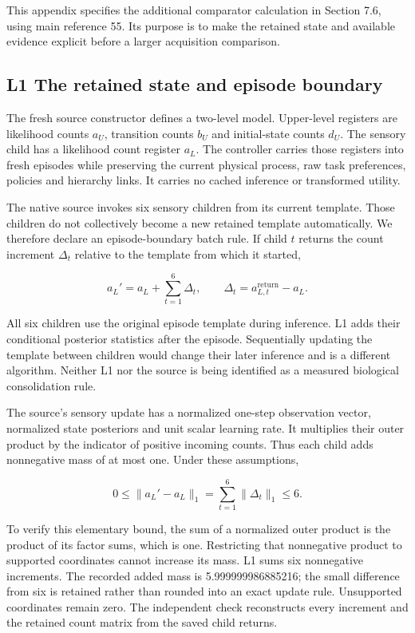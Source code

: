\documentclass[
  american,
  11pt,
  letterpaper,
]{article}
\begin{document}
This appendix specifies the additional comparator calculation in Section 7.6, using main reference 55. Its purpose is to make the retained state and available evidence explicit before a larger acquisition comparison.

\subsection{L1 The retained state and episode boundary}\label{l1-the-retained-state-and-episode-boundary}

The fresh source constructor defines a two-level model. Upper-level registers are likelihood counts \(a_U\), transition counts \(b_U\) and initial-state counts \(d_U\). The sensory child has a likelihood count register \(a_L\). The controller carries those registers into fresh episodes while preserving the current physical process, raw task preferences, policies and hierarchy links. It carries no cached inference or transformed utility.

The native source invokes six sensory children from its current template. Those children do not collectively become a new retained template automatically. We therefore declare an episode-boundary batch rule. If child \(t\) returns the count increment \(\Delta_t\) relative to the template from which it started,

\begin{equation}
a_L'=a_L+\sum_{t=1}^{6}\Delta_t,
\qquad \Delta_t=a_{L,t}^{\mathrm{return}}-a_L.
\tag{L1}
\end{equation}

All six children use the original episode template during inference. L1 adds their conditional posterior statistics after the episode. Sequentially updating the template between children would change their later inference and is a different algorithm. Neither L1 nor the source is being identified as a measured biological consolidation rule.

The source's sensory update has a normalized one-step observation vector, normalized state posteriors and unit scalar learning rate. It multiplies their outer product by the indicator of positive incoming counts. Thus each child adds nonnegative mass of at most one. Under these assumptions,

\begin{equation}
0\le\lVert a_L'-a_L\rVert_1
=\sum_{t=1}^{6}\lVert\Delta_t\rVert_1\le6.
\tag{L2}
\end{equation}

To verify this elementary bound, the sum of a normalized outer product is the product of its factor sums, which is one. Restricting that nonnegative product to supported coordinates cannot increase its mass. L1 sums six nonnegative increments. The recorded added mass is 5.999999986885216; the small difference from six is retained rather than rounded into an exact update rule. Unsupported coordinates remain zero. The independent check reconstructs every increment and the retained count matrix from the saved child returns.
\end{document}
